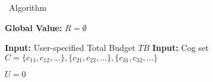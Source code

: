 \begin{algorithm}[h]
    \caption{\search\ Algorithm}
    \label{alg:main}
      \small
\begin{algorithmic}[1]
\STATE \textbf{Global Value:} $R = \emptyset$ 

\STATE \textbf{Input:} User-specified Total Budget $TB$
\STATE \textbf{Input:} Cog set $C = \{c_{11},c_{12},...\}, \{c_{21},c_{22},...\}, \{c_{31},c_{32},...\}$

    \STATE
\STATE $U = 0$ 


\end{algorithmic}
\end{algorithm}
